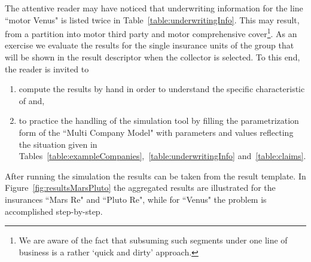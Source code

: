 {The attentive reader may have noticed that underwriting information for the line ``motor
Venus" is listed twice in Table~\ref{table:underwritingInfo}. This may result, \eg from a
partition into motor third party and motor comprehensive cover\footnote{We are aware of the
fact that subsuming such segments under one line of business is a rather `quick and dirty'
approach.}.
As an exercise we evaluate the results for the single insurance units of the group that will
be shown in the result descriptor when the collector  is selected.
To this end, the reader is invited to 
\begin{enumerate}
\item compute the results by hand in order to understand the
specific characteristic of  and, 
\item to practice the handling of the simulation tool by filling the parametrization form of the ``Multi Company
Model" with parameters and values reflecting the situation given in
Tables~\ref{table:exampleCompanies},~\ref{table:underwritingInfo} and~\ref{table:claims}.
\end{enumerate}
After running the simulation the results can be taken from the result template.
In Figure~\ref{fig:resultsMarsPluto} the aggregated results are illustrated for the
insurances ``Mars Re" and ``Pluto Re", while for ``Venus" the problem is accomplished
step-by-step.

}
